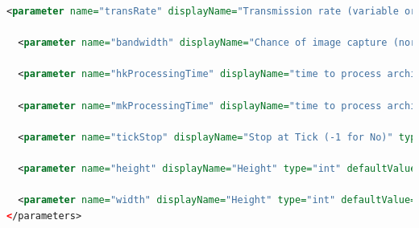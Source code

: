 \begin{appendices}
\begin{lstlisting}[language=XML, caption={Example params.xml file for a Repast simulation}]
  <parameter name="transRate" displayName="Transmission rate (variable or ideal)" type="java.lang.String" defaultValue="variable" isReadOnly="false" converter="repast.simphony.parameter.StringConverterFactory$StringStringConverter" />
  
  <parameter name="bandwidth" displayName="Chance of image capture (normal or saturated)" type="java.lang.String" defaultValue="normal" isReadOnly="false" converter="repast.simphony.parameter.StringConverterFactory$StringStringConverter" />
  
  <parameter name="hkProcessingTime" displayName="time to process archive" type="int" defaultValue="43" isReadOnly="false" converter="repast.simphony.parameter.StringConverterFactory$IntConverter"/>
  
  <parameter name="mkProcessingTime" displayName="time to process archive" type="int" defaultValue="5" isReadOnly="false" converter="repast.simphony.parameter.StringConverterFactory$IntConverter"/>
  
  <parameter name="tickStop" displayName="Stop at Tick (-1 for No)" type="int" defaultValue="15552000" isReadOnly="false" converter="repast.simphony.parameter.StringConverterFactory$IntConverter"/>
    
  <parameter name="height" displayName="Height" type="int" defaultValue="1200" isReadOnly="false" converter="repast.simphony.parameter.StringConverterFactory$IntConverter" />
  
  <parameter name="width" displayName="Height" type="int" defaultValue="1200" isReadOnly="false" converter="repast.simphony.parameter.StringConverterFactory$IntConverter" />
</parameters>
\end{lstlisting}

\end{appendices}